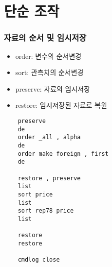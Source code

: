 \documentclass[aspectratio=169,xcolor=dvipsnames,handout]{beamer}
\begin{document}
\section{단순 조작}
\begin{frame}
    \frametitle{자료의 순서 및 임시저장}
    \begin{itemize}[<+->]
        \item order: 변수의 순서변경
        \item sort: 관측치의 순서변경
        \item preserve: 자료의 임시저장
        \item restore: 임시저장된 자료로 복원
    \end{itemize}
    \framebreak\relax
    \begin{verbatim}
    preserve
    de
    order _all , alpha
    de
    order make foreign , first
    de

    restore , preserve
    list
    sort price
    list
    sort rep78 price
    list

    restore
    restore

    cmdlog close
    \end{verbatim}
\end{frame}


\end{document}
